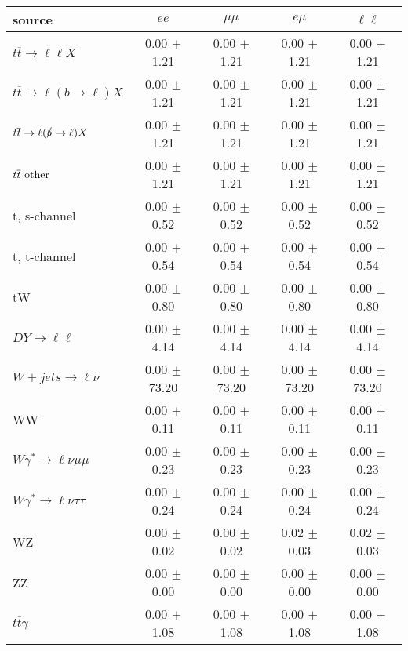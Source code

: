 \begin{tabular}{l|cccc} \hline\hline
source & $ee$ & $\mu\mu$ & $e\mu$ & $\ell\ell $ \\
\hline
$t\overline{t} \rightarrow \ell \ell X$ &  0.00 $\pm$  1.21 &  0.00 $\pm$  1.21 &  0.00 $\pm$  1.21 &  0.00 $\pm$  1.21 \\
$t\overline{t} \rightarrow \ell (b \rightarrow \ell) X$ &  0.00 $\pm$  1.21 &  0.00 $\pm$  1.21 &  0.00 $\pm$  1.21 &  0.00 $\pm$  1.21 \\
$t\overline{t} \rightarrow \ell (\slashed b \rightarrow \ell) X$ &  0.00 $\pm$  1.21 &  0.00 $\pm$  1.21 &  0.00 $\pm$  1.21 &  0.00 $\pm$  1.21 \\
        $t\overline{t}\ \rm{other}$ &  0.00 $\pm$  1.21 &  0.00 $\pm$  1.21 &  0.00 $\pm$  1.21 &  0.00 $\pm$  1.21 \\
\hline
                       t, s-channel &  0.00 $\pm$  0.52 &  0.00 $\pm$  0.52 &  0.00 $\pm$  0.52 &  0.00 $\pm$  0.52 \\
                       t, t-channel &  0.00 $\pm$  0.54 &  0.00 $\pm$  0.54 &  0.00 $\pm$  0.54 &  0.00 $\pm$  0.54 \\
                                 tW &  0.00 $\pm$  0.80 &  0.00 $\pm$  0.80 &  0.00 $\pm$  0.80 &  0.00 $\pm$  0.80 \\
\hline
         $DY \rightarrow \ell \ell$ &  0.00 $\pm$  4.14 &  0.00 $\pm$  4.14 &  0.00 $\pm$  4.14 &  0.00 $\pm$  4.14 \\
      $W+jets \rightarrow \ell \nu$ &  0.00 $\pm$ 73.20 &  0.00 $\pm$ 73.20 &  0.00 $\pm$ 73.20 &  0.00 $\pm$ 73.20 \\
                                 WW &  0.00 $\pm$  0.11 &  0.00 $\pm$  0.11 &  0.00 $\pm$  0.11 &  0.00 $\pm$  0.11 \\
\hline
$W\gamma^{*} \rightarrow \ell \nu \mu\mu$ &  0.00 $\pm$  0.23 &  0.00 $\pm$  0.23 &  0.00 $\pm$  0.23 &  0.00 $\pm$  0.23 \\
$W\gamma^{*} \rightarrow \ell \nu \tau\tau$ &  0.00 $\pm$  0.24 &  0.00 $\pm$  0.24 &  0.00 $\pm$  0.24 &  0.00 $\pm$  0.24 \\
                                 WZ &  0.00 $\pm$  0.02 &  0.00 $\pm$  0.02 &  0.02 $\pm$  0.03 &  0.02 $\pm$  0.03 \\
                                 ZZ &  0.00 $\pm$  0.00 &  0.00 $\pm$  0.00 &  0.00 $\pm$  0.00 &  0.00 $\pm$  0.00 \\
\hline
              $t\overline{t}\gamma$ &  0.00 $\pm$  1.08 &  0.00 $\pm$  1.08 &  0.00 $\pm$  1.08 &  0.00 $\pm$  1.08 \\

\end{tabular}
